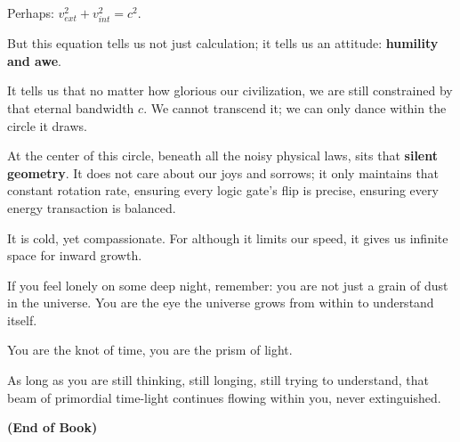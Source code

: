 Perhaps: $v_{ext}^2 + v_{int}^2 = c^2$.

But this equation tells us not just calculation; it tells us an attitude: \textbf{humility and awe}.

It tells us that no matter how glorious our civilization, we are still constrained by that eternal bandwidth $c$. We cannot transcend it; we can only dance within the circle it draws.

At the center of this circle, beneath all the noisy physical laws, sits that \textbf{silent geometry}. It does not care about our joys and sorrows; it only maintains that constant rotation rate, ensuring every logic gate's flip is precise, ensuring every energy transaction is balanced.

It is cold, yet compassionate. For although it limits our speed, it gives us infinite space for inward growth.

If you feel lonely on some deep night, remember: you are not just a grain of dust in the universe. You are the eye the universe grows from within to understand itself.

You are the knot of time, you are the prism of light.

As long as you are still thinking, still longing, still trying to understand, that beam of primordial time-light continues flowing within you, never extinguished.

\textbf{(End of Book)}

